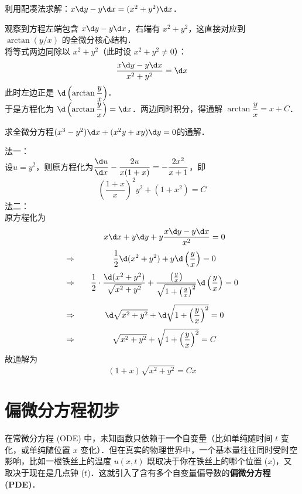 \documentclass[12pt, a4paper, oneside, UTF8]{ctexbook}
\begin{document}
\begin{example}
    利用配凑法求解：$x \d y - y \d x = (x^2+y^2) \d x$．
\end{example}
\begin{solution}
    观察到方程左端包含 $x\d y - y\d x$，右端有 $x^2+y^2$，这直接对应到 $\arctan(y/x)$ 的全微分核心结构．\\
    将等式两边同除以 $x^2+y^2$（此时设 $x^2+y^2\neq0$）：
    \[ \frac{x \d y - y \d x}{x^2+y^2} = \d x \]
    此时左边正是 $\d\left(\arctan\dfrac{y}{x}\right)$．\\
    于是方程化为 $\d\left(\arctan\dfrac{y}{x}\right) = \d x$．两边同时积分，得通解 $\boxed{\arctan\dfrac{y}{x} = x + C}$．
\end{solution}

\begin{exercise}
    求全微分方程$(x^3-y^2)\d x +(x^2y+xy)\d y=0$的通解．
\end{exercise}
\begin{solution}
    法一：\\
    设$u=y^2$，则原方程化为$\displaystyle \frac{\d u}{\d x}-\frac{2u}{x(1+x)}=-\frac{2x^2}{x+1}$，即
    \[ \boxed{\left(\frac{1+x}{x}\right)^2y^2+(1+x^2)=C} \]
    法二：\\
    原方程化为
    \[
        \begin{array}{l@{\qquad}c}
            &\displaystyle x\d x+y \d y +y \frac{x\d y-y\d x}{x^2}=0\\[10pt]
            \Rightarrow & \displaystyle \dfrac{1}{2}\d(x^2+y^2)+y \d \left(\frac{y}{x}\right)=0\\[10pt]
            \Rightarrow & \displaystyle \dfrac{1}{2}\cdot \dfrac{\d(x^2+y^2)}{\sqrt{x^2+y^2}}+\dfrac{\left(\frac{y}{x}\right)}{\sqrt{1+\left(\frac{y}{x}\right)^2}}\d \left(\frac{y}{x}\right)=0\\[20pt]
            \Rightarrow & \displaystyle \d \sqrt{x^2+y^2}+\d \sqrt{1+\left(\frac{y}{x}\right)^2}=0\\[10pt]
            \Rightarrow & \displaystyle \sqrt{x^2+y^2}+\sqrt{1+\left(\frac{y}{x}\right)^2}=C\\
        \end{array}
    \]
    故通解为
    \[ \boxed{(1+x)\sqrt{x^2+y^2}=Cx} \]
\end{solution}

\section{偏微分方程初步}
在常微分方程 (ODE) 中，未知函数只依赖于\textbf{一个}自变量（比如单纯随时间 $t$ 变化，或单纯随位置 $x$ 变化）．但在真实的物理世界中，一个基本量往往同时受时空影响，比如一根铁丝上的温度 $u(x,t)$ 既取决于你在铁丝上的哪个位置 ($x$)，又取决于现在是几点钟 ($t$)．这就引入了含有多个自变量偏导数的\textbf{偏微分方程 (PDE)}．
\end{document}
